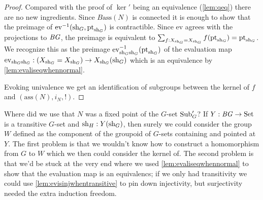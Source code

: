 \begin{proof}

Compared with the proof of $\ker'$ being an equivalence (\cref{lem:qeq}) there are no new ingredients.
Since $B\mathrm{ass}(N)$ is connected it is enough to show that the preimage of $\mathrm{ev}^{-1}(\mathrm{sh}_G,\mathrm{pt}_{\mathrm{sh}_G})$ is contractible.  
Since $\mathrm{ev}$ agrees with the projections to $\mathit{B}\mathit{G}$, the preimage is equivalent to $\sum_{f:X_{\mathrm{sh}_G}=X_{\mathrm{sh}_G}}f(\mathrm{pt}_{\mathrm{sh}_G})=\mathrm{pt}_{\mathrm{sh}_G}$.  We recognize this as the preimage $\mathrm{ev}_{{\mathrm{sh}_G}{\mathrm{sh}_G}}^{-1}(\mathrm{pt}_{\mathrm{sh}_G})$
of the evaluation map 
$\mathrm{ev}_{{\mathrm{sh}_G}{\mathrm{sh}_G}}:(X_{\mathrm{sh}_G}=X_{\mathrm{sh}_G})\to X_{\mathrm{sh}_G}(\mathrm{sh}_G)$ which is an equivalence by \cref{lem:evaliseqwhennormal}.  

Evoking univalence we get an identification of subgroups between the kernel of $f$ and $(\mathrm{ass}(N),i_N,!)$.
\end{proof}


\begin{remark}
  Where did we use that $N$ was a fixed point of the $G$-set $\mathrm{Sub}_G'$?  If $Y:\mathit{B}\mathit{G}\to\mathrm{Set}$ is a transitive $G$-set and $\mathrm{sh}_H:Y(\mathrm{sh}_G)$, then surely we could consider the group $W$ defined as the component of the groupoid of $G$-sets containing and pointed at $Y$.  The first problem is that we wouldn't know how to construct a homomorphism from $G$ to $W$ which we then could consider the kernel of.  The second problem is that we'd be stuck at the very end where we 
used \cref{lem:evaliseqwhennormal} to show that the evaluation map is an equivalencs; if we only had transitivity we could use \cref{lem:evisinjwhentransitive} to pin down injectivity, but surjectivity needed the extra induction freedom. 
\end{remark}

